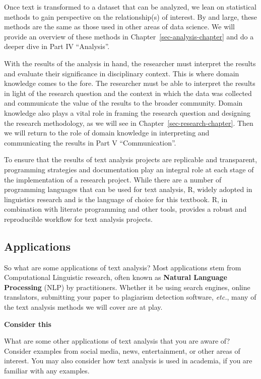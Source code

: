 \documentclass[
  letterpaper,
  krantz1]{latex/krantz-mod}
\theoremstyle{definition}
\theoremstyle{definition}
\theoremstyle{remark}
\begin{document}
Once text is transformed to a dataset that can be analyzed, we lean on
statistical methods to gain perspective on the relationship(s) of
interest. By and large, these methods are the same as those used in
other areas of data science. We will provide an overview of these
methods in Chapter~\ref{sec-analysis-chapter} and do a deeper dive in
Part IV ``Analysis''.

With the results of the analysis in hand, the researcher must
interpret the results and evaluate their
significance in disciplinary context. This is where domain knowledge
comes to the fore. The researcher must be able to interpret the results
in light of the research question and the
context in which the data was collected and communicate the value of the
results to the broader community. Domain
knowledge also plays a vital role in framing the
research question and designing the research
methodology, as we will see in
Chapter~\ref{sec-research-chapter}. Then we will return to the role of
domain knowledge in interpreting and communicating the results in Part V
``Communication''.

To ensure that the results of text analysis projects are replicable
 and transparent,
programming strategies and documentation play
an integral role at each stage of the implementation of a research
project. While there are a number of programming languages that can be
used for text analysis, R,  widely adopted in linguistics
research and is the language of choice for this textbook. R, in
combination with literate programming and
other tools, provides a robust and reproducible workflow for text
analysis projects.

\subsection{Applications}\label{applications}

So what are some applications of text analysis? Most applications stem
from Computational Linguistic research, often known as \textbf{Natural
Language Processing} (NLP) by
practitioners. Whether it be using search engines, online translators,
submitting your paper to plagiarism detection software, \emph{etc.},
many of the text analysis methods we will cover are at play.

\begin{tcolorbox}[enhanced jigsaw, toprule=.15mm, breakable, colback=white, arc=.35mm, left=2mm, colframe=quarto-callout-color-frame, opacityback=0, bottomrule=.15mm, rightrule=.15mm, leftrule=.75mm]

\textbf{ Consider this}

What are some other applications of text analysis that you are aware of?
Consider examples from social media, news, entertainment, or other areas
of interest. You may also consider how text analysis is used in
academia, if you are familiar with any examples.

\end{tcolorbox}
\end{document}
